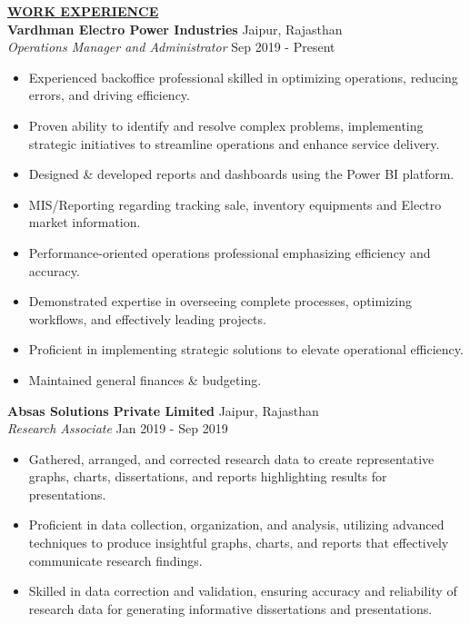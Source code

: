 \documentclass{article}
\begin{document}
% 
%
\noindent \textbf{\underline{WORK EXPERIENCE}} \\
\noindent \textbf{Vardhman Electro Power Industries} \hfill Jaipur, Rajasthan \\
\textit{Operations Manager and Administrator} \hfill Sep 2019 - Present
\begin{itemize}[noitemsep,nolistsep,leftmargin=*]
\item Experienced backoffice professional skilled in optimizing operations, reducing errors, and driving efficiency.
\item Proven ability to identify and resolve complex problems, implementing strategic initiatives to streamline operations and enhance service delivery.
\item Designed & developed reports and dashboards using the Power BI platform.
\item MIS/Reporting regarding tracking sale, inventory equipments and Electro market information.
\item Performance-oriented operations professional emphasizing efficiency and accuracy.
\item Demonstrated expertise in overseeing complete processes, optimizing workflows, and effectively leading projects.
\item Proficient in implementing strategic solutions to elevate operational efficiency.
\item Maintained general finances & budgeting. \\
\end{itemize}

\noindent \textbf{Absas Solutions Private Limited} \hfill Jaipur, Rajasthan \\
\textit{Research Associate} \hfill Jan 2019 - Sep 2019
\begin{itemize}[noitemsep,nolistsep,leftmargin=*]
\item Gathered, arranged, and corrected research data to create representative graphs, charts, dissertations, and reports highlighting results for presentations.
\item Proficient in data collection, organization, and analysis, utilizing advanced techniques to produce insightful graphs, charts, and reports that effectively communicate research findings.
\item Skilled in data correction and validation, ensuring accuracy and reliability of research data for generating informative dissertations and presentations. \\
\end{itemize}
\end{document}
